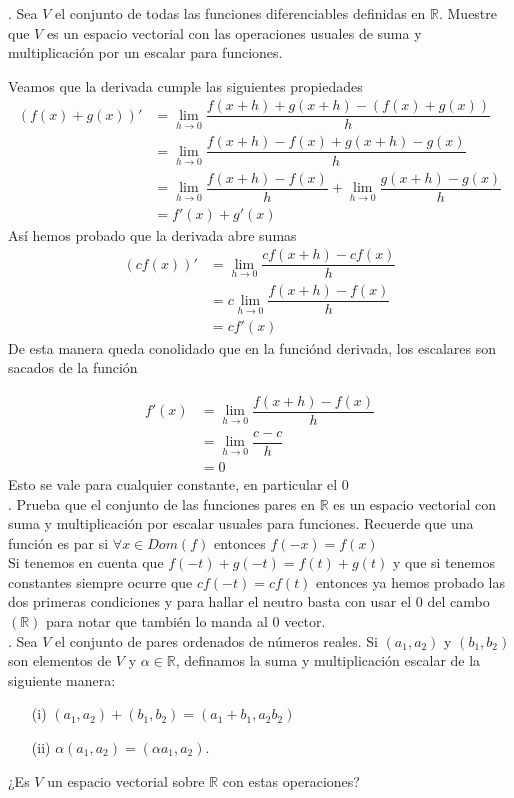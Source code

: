 \documentclass[letterpaper]{article}
\newcommand{\R}{\mathds{R}}
\renewcommand{\*}{\cdot}
\theoremstyle{definition}
\begin{document}
 . Sea $V$ el conjunto de todas las funciones diferenciables definidas en $\mathbb{R}$. Muestre que $V$ es un espacio vectorial con las operaciones usuales de suma y multiplicación por un escalar para funciones. 
	
	Veamos que la derivada cumple las siguientes propiedades
	\begin{align*}
	(f(x) + g(x))' &= \lim_{h\to 0} \dfrac{f(x +h) + g(x + h) - (f(x) + g(x))}{h}\\
	& = \lim_{h\to 0} \dfrac{f(x+h) - f(x) + g(x+h) - g(x)}{h}\\
	&= \lim_{h\to 0} \dfrac{f(x+h)-f(x)}{h} + \lim_{h\to 0} \dfrac{g(x+h)-g(x)}{h}\\
	&=f'(x) + g'(x)
	\end{align*}
	Así hemos probado que la derivada abre sumas
	\begin{align*}
	(cf(x))' &= \lim_{h\to 0} \dfrac{cf(x + h) - cf(x)}{h}\\
	& = c\lim_{h\to 0} \dfrac{f(x+h)-f(x)}{h}\\
	&= cf'(x)
	\end{align*}
	De esta manera queda conolidado que en la funciónd derivada, los escalares son sacados de la función
	
	\begin{align*}
	f'(x) &= \lim_{h\to 0} \dfrac{f(x + h) - f(x)}{h}\\
	& = \lim_{h\to 0} \dfrac{c-c}{h}\\
	&= 0
	\end{align*}
	Esto se vale para cualquier constante, en particular el 0\\
	
 . Prueba que el conjunto de las funciones pares en $\mathbb{R}$ es un espacio vectorial con suma y multiplicación por escalar usuales para funciones. Recuerde que una función es par si $\forall x \in Dom(f)$ entonces $f(-x) = f(x)$ \\
 	
 	Si tenemos en cuenta que $f(-t) + g(-t) = f(t) + g(t)$ y que si tenemos constantes siempre ocurre que $cf(-t) = cf(t) $ entonces ya hemos probado las dos primeras condiciones y para hallar el neutro basta con usar el 0 del cambo $(\R)$ para notar que también lo manda al 0 vector.\\
 	
. Sea $V$ el conjunto de pares ordenados de números reales. Si $(a_{1},a_{2})$ y $(b_{1},b_{2})$ son elementos de $V$ y $\alpha \in \mathbb{R}$, definamos la suma y multiplicación escalar de la siguiente manera:
\begin{enumerate}
\item[(i)] $(a_{1},a_{2}) + (b_{1},b_{2}) = (a_{1} + b_{1}, a_{2}b_{2})$ 
\item[(ii)] $\alpha(a_{1},a_{2}) = (\alpha a_{1},a_{2})$.\\
\end{enumerate}
¿Es $V$ un espacio vectorial sobre $\mathbb{R}$ con estas operaciones?\\
\end{document}
